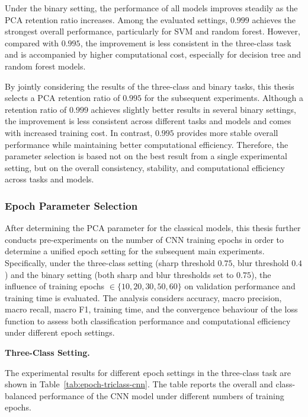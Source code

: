 \par Under the binary setting, the performance of all models improves steadily
as the PCA retention ratio increases. Among the evaluated settings, $0.999$
achieves the strongest overall performance, particularly for SVM and random
forest. However, compared with $0.995$, the improvement is less consistent in
the three-class task and is accompanied by higher computational cost,
especially for decision tree and random forest models.

\par By jointly considering the results of the three-class and binary tasks,
this thesis selects a PCA retention ratio of $0.995$ for the subsequent
experiments. Although a retention ratio of $0.999$ achieves slightly better
results in several binary settings, the improvement is less consistent across
different tasks and models and comes with increased training cost. In contrast,
$0.995$ provides more stable overall performance while maintaining better
computational efficiency. Therefore, the parameter selection is based not on
the best result from a single experimental setting, but on the overall
consistency, stability, and computational efficiency across tasks and models.

\subsubsection{Epoch Parameter Selection}

\par After determining the PCA parameter for the classical models, this thesis
further conducts pre-experiments on the number of CNN training epochs in order
to determine a unified epoch setting for the subsequent main experiments.
Specifically, under the three-class setting (sharp threshold $0.75$, blur
threshold $0.4$) and the binary setting (both sharp and blur thresholds set to
$0.75$), the influence of training epochs
\(\in\{10,20,30,50,60\}\) on validation performance and training time is
evaluated. The analysis considers accuracy, macro precision, macro recall,
macro F1, training time, and the convergence behaviour of the loss function to
assess both classification performance and computational efficiency under
different epoch settings.

\par\medskip \noindent\textbf{Three-Class Setting.}
\par The experimental results for different epoch settings in the three-class
task are shown in Table~\ref{tab:epoch-triclass-cnn}. The table reports the
overall and class-balanced performance of the CNN model under different numbers
of training epochs.


